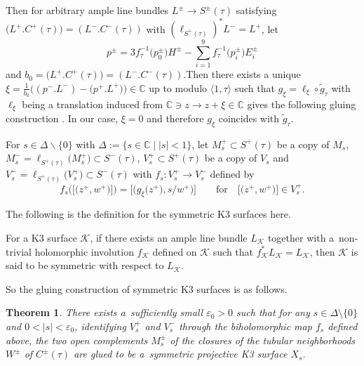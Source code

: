 \documentclass[pdftex]{sigma}
\numberwithin{equation}{section}
\newtheorem{Theorem}{Theorem}[section]
\begin{document}
Then for arbitrary ample line bundles $L^{\pm}\rightarrow S^{\pm}(\tau)$ satisfying $\bigl(L^{+}.C^{+}(\tau)\bigr)=(L^{-}.C^{-}(\tau))$ with $(\ell_{S^{+}(\tau)})^*L^{-}=L^{+}$, let
\[p^{\pm}=3f^{-1}_{\tau}\bigl(p_0^{\pm}\bigr)H^{\pm}-\sum_{i=1}^9f^{-1}_{\tau}\bigl(p_i^{\pm}\bigr)E^{\pm}_i\]
and $b_0=\bigl(L^{+}.C^{+}(\tau)\bigr)=(L^{-}.C^{-}(\tau))$.Then there exists a unique $\xi=\frac{1}{b_0}\bigl((p^-.L^-)-\bigl(p^+.L^+\bigr)\bigr)\in\mathbb{C}$ up to modulo $\langle1,\tau\rangle$ such that $g_{\xi}=\ell_{\xi}\circ\widetilde{g}_{\tau}$ with $\ell_{\xi}$ being a translation induced from $\mathbb{C}\ni z\rightarrow z+\xi\in\mathbb{C}$ gives the following gluing construction \cite[Proposition~5.1]{Takayuki-Takato2}. In our case, $\xi =0$ and therefore $g_{\xi}$ coincides with $\widetilde{g}_{\tau}$.

For $s\in \Delta \backslash \{0\}$ with $\Delta:=\{s\in \mathbb{C}\mid |s|<1\}$, let $M_s^+\subset S^+(\tau)$ be a copy of $M_s$, $M^-_s =\ell_{S^+(\tau)}\bigl(M^+_s\bigr) \subset S^-(\tau)$, $V^+_s \subset S^+(\tau)$ be a copy of $V_s$ and $V^-_s=\ell_{S^+(\tau)}\bigl(V^+_s\bigr) \subset S^-(\tau)$ with
$f_s\colon V^{+}_s \rightarrow V^{-}_s$ defined by
\[f_s\bigl(\big[\bigl(z^+,w^+\bigr)\big]\bigr)=\big[\bigl(g_{\xi}\bigl(z^+\bigr),s/w^+\bigr)\big] \qquad \text{for} \quad \big[\bigl(z^+,w^+\bigr)\big]\in V^+_s.\]

The following is the definition for the symmetric K3 surfaces here.

\begin{Definition} \label{Definition2.7}
For a K3 surface $\mathcal{K}$, if there exists an ample line bundle $L_{\mathcal{K}}$ together with a~non-trivial holomorphic involution $f_{\mathcal{K}}$ defined on $\mathcal{K}$ such that $f_{\mathcal{K}}^*L_{\mathcal{K}}=L_{\mathcal{K}}$, then $\mathcal{K}$ is said to be symmetric with respect to $L_{\mathcal{K}}$.
\end{Definition}

So the gluing construction of symmetric K3 surfaces is as follows.

\begin{Theorem} \label{Theorem2.8}
There exists a~sufficiently small $\varepsilon_0 >0$ such that for any $s \in \Delta \setminus \{ 0\}$ and ${0<|s|<\varepsilon_0}$, identifying $V^{+}_s$ and $V^{-}_s$ through the biholomorphic map $f_s$ defined above, the two open complements $M^{\pm}_s$ of the closures of the tubular neighborhoods $W^{\pm}$ of $C^{\pm}(\tau)$ are glued to be a~symmetric projective K3 surface $X_s$.
\end{Theorem}
\end{document}
